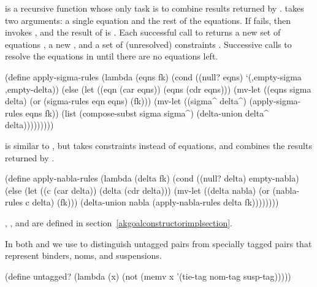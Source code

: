 is a recursive function whose only task is
to combine results returned by .
 takes two arguments: a single equation and the
rest of the equations.  If  fails, then
 invokes , and the result of
 is .  Each successful call to
 returns a new set of equations , a
new , and a set of (unresolved) constraints
.  Successive calls to  resolve the
equations in  until there are no equations left.

\newpage

\schemedisplayspace
\begin{schemedisplay}
(define apply-sigma-rules
  (lambda (eqns fk)
    (cond
      ((null? eqns) `(,empty-sigma ,empty-delta))
      (else
       (let ((eqn (car eqns)) (eqns (cdr eqns)))
         (mv-let ((eqns sigma delta) (or (sigma-rules eqn eqns) (fk)))
           (mv-let ((sigma^ delta^) (apply-sigma-rules eqns fk))
             (list (compose-subst sigma sigma^) (delta-union delta^ delta)))))))))
\end{schemedisplay}

 is similar to ,
but takes constraints instead of equations, and combines the results
returned by .

\schemedisplayspace
\begin{schemedisplay}
(define apply-nabla-rules
  (lambda (delta fk)
    (cond
      ((null? delta) empty-nabla)
      (else
       (let ((c (car delta)) (delta (cdr delta)))
         (mv-let ((delta nabla) (or (nabla-rules c delta) (fk)))
           (delta-union nabla (apply-nabla-rules delta fk))))))))
\end{schemedisplay}

\noindent {}, , and
 are defined in section~\ref{akgoalconstructorimplsection}.

In both  and 
we use  
to distinguish untagged pairs from specially tagged pairs that
represent binders, noms, and suspensions.

\schemedisplayspace
\begin{schemedisplay}
(define untagged?
  (lambda (x)
    (not (memv x '(tie-tag nom-tag susp-tag)))))
\end{schemedisplay}

